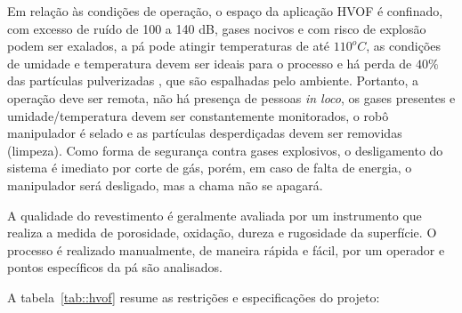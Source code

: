 
Em relação às condições de operação, o espaço da aplicação HVOF é confinado, com
excesso de ruído de 100 a 140 dB, gases nocivos e com risco de explosão podem
ser exalados, a pá pode atingir temperaturas de até $110^oC$, as condições de
umidade e temperatura devem ser ideais para o processo e há perda de $40\%$
das partículas pulverizadas  \citep{wu2006rebound}, que são espalhadas pelo
ambiente. Portanto, a operação deve ser remota, não há presença de pessoas \textit{in loco}, os gases
presentes e umidade/temperatura devem ser constantemente monitorados, o robô
manipulador é selado e as partículas desperdiçadas devem ser removidas
(limpeza). Como forma de segurança contra gases explosivos, o desligamento do
sistema é imediato por corte de gás, porém, em caso de falta de energia, o
manipulador será desligado, mas a chama não se apagará.

A qualidade do revestimento é geralmente avaliada por um instrumento que
realiza a medida de porosidade, oxidação, dureza e rugosidade da superfície. O
processo é realizado manualmente, de maneira rápida e fácil, por um operador e
pontos específicos da pá são analisados.

A tabela~\ref{tab::hvof} resume as restrições e especificações do
projeto:

